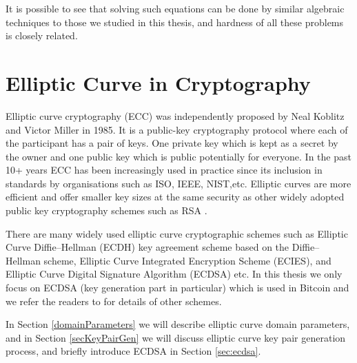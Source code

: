 It is possible to see that solving such equations can be done by similar algebraic techniques to those we studied in this thesis, and hardness of all these problems is closely related.  



\section{Elliptic Curve in Cryptography}
Elliptic curve cryptography (ECC) was independently proposed by Neal Koblitz\cite{koblitz1987elliptic} and Victor Miller \cite{miller1985use} in 1985. It is a public-key cryptography protocol where each of the participant has a pair of keys. One private key which is kept as a secret by the owner and one public key which is public potentially for everyone. In the past 10+ years ECC has been increasingly used in practice since its inclusion in standards by organisations such as ISO, IEEE, NIST,etc. Elliptic curves are more efficient \cite{bernstein2009ebacs} and offer smaller key sizes \cite{lenstra2001selecting} at the same security as other widely adopted public key cryptography schemes such as RSA \cite{rivest1978method}. 

There are many widely used elliptic curve cryptographic schemes such as Elliptic Curve Diffie–Hellman (ECDH) key agreement scheme based on the Diffie–Hellman scheme, Elliptic Curve Integrated Encryption Scheme (ECIES), and Elliptic Curve Digital Signature Algorithm (ECDSA) etc. In this thesis we only focus on ECDSA \cite{johnson2001elliptic} (key generation part in particular) which is used in Bitcoin and we refer the readers to \cite{hankerson2006guide} for details of other schemes.

In Section \ref{domainParameters} we will describe elliptic curve domain parameters, and in Section \ref{secKeyPairGen} we will discuss elliptic curve key pair generation process, and briefly introduce ECDSA in Section \ref{sec:ecdsa}.

